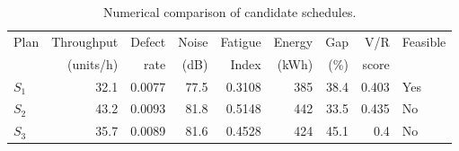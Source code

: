 \begin{table}[htbp]
\centering
\caption{Numerical comparison of candidate schedules.}
\label{tab:numerical-sim}
\small
\begin{tabular}{@{}lrrrrrrrl@{}}
\toprule
Plan & Throughput & Defect & Noise & Fatigue & Energy & Gap & V/R & Feasible \\
     & (units/h)  & rate   & (dB)  & Index   & (kWh)  & (\%) & score &         \\
\midrule
$S_{1}$ & 32.1 & 0.0077 & 77.5 & 0.3108 & 385 & 38.4 & 0.403 & Yes \\
$S_{2}$ & 43.2 & 0.0093 & 81.8 & 0.5148 & 442 & 33.5 & 0.435 & No \\
$S_{3}$ & 35.7 & 0.0089 & 81.6 & 0.4528 & 424 & 45.1 & 0.4 & No \\
\bottomrule
\end{tabular}
\end{table}
